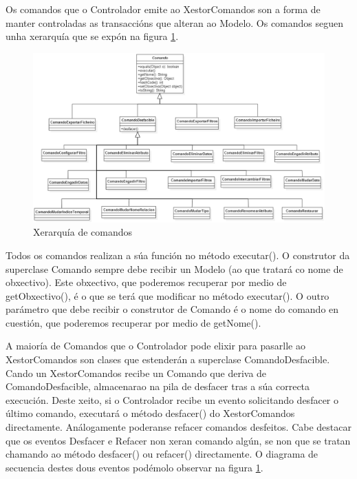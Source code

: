 Os comandos que o Controlador emite ao XestorComandos son a forma de manter controladas as transaccións que alteran ao Modelo. Os comandos seguen unha xerarquía que se expón na figura \ref{xerarquiaComandos}.

\begin{figure}
\centering
\includegraphics[width=\textwidth,height=\textheight,keepaspectratio]{figuras/xerarquiaComandos}
\caption{Xerarquía de comandos}
\label{xerarquiaComandos}
\end{figure}

Todos os comandos realizan a súa función no método executar(). O construtor da superclase Comando sempre debe recibir un Modelo (ao que tratará co nome de obxectivo). Este obxectivo, que poderemos recuperar por medio de getObxectivo(), é o que se terá que modificar no método executar(). O outro parámetro que debe recibir o construtor de Comando é o nome do comando en cuestión, que poderemos recuperar por medio de getNome().

A maioría de Comandos que o Controlador pode elixir para pasarlle ao XestorComandos son clases que estenderán a superclase ComandoDesfacible. Cando un XestorComandos recibe un Comando que deriva de ComandoDesfacible, almacenarao na pila de desfacer tras a súa correcta execución. Deste xeito, si o Controlador recibe un evento solicitando desfacer o último comando, executará o método desfacer() do XestorComandos directamente. Análogamente poderanse refacer comandos desfeitos. Cabe destacar que os eventos Desfacer e Refacer non xeran comando algún, se non que se tratan chamando ao método desfacer() ou refacer() directamente. O diagrama de secuencia destes dous eventos podémolo observar na figura \ref{xerarquiaComandos}.

